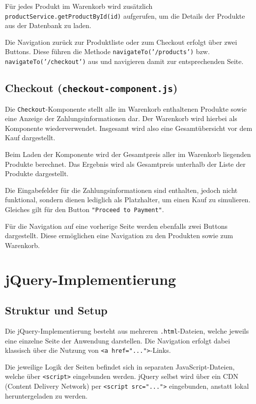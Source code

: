 \documentclass[oneside]{ausarbeitung}
\begin{document}
Für jedes Produkt im Warenkorb wird zusätzlich \texttt{productService.getProductById(id)} aufgerufen, um die Details der Produkte aus der Datenbank zu laden.

Die Navigation zurück zur Produktliste oder zum Checkout erfolgt über zwei Buttons. Diese führen die Methode \texttt{navigateTo('/products')} bzw. \texttt{navigateTo('/checkout')} aus und navigieren damit zur entsprechenden Seite.


\subsection{Checkout (\texttt{checkout-component.js})}

Die \texttt{Checkout}-Komponente stellt alle im Warenkorb enthaltenen Produkte sowie eine Anzeige der Zahlungsinformationen dar. Der Warenkorb wird hierbei als Komponente wiederverwendet. Insgesamt wird also eine Gesamtübersicht vor dem Kauf dargestellt.

Beim Laden der Komponente wird der Gesamtpreis aller im Warenkorb liegenden Produkte berechnet. Das Ergebnis wird als Gesamtpreis unterhalb der Liste der Produkte dargestellt. 

Die Eingabefelder für die Zahlungsinformationen sind enthalten, jedoch nicht funktional, sondern dienen lediglich als Platzhalter, um einen Kauf zu simulieren. Gleiches gilt für den Button \texttt{"Proceed to Payment"}.

Für die Navigation auf eine vorherige Seite werden ebenfalls zwei Buttons dargestellt. Diese ermöglichen eine Navigation zu den Produkten sowie zum Warenkorb.


\section{jQuery-Implementierung}

\subsection{Struktur und Setup}

Die jQuery-Implementierung besteht aus mehreren \texttt{.html}-Dateien, welche jeweils eine einzelne Seite der Anwendung darstellen. Die Navigation erfolgt dabei klassisch über die Nutzung von \texttt{<a href="...">}-Links.

Die jeweilige Logik der Seiten befindet sich in separaten JavaScript-Dateien, welche über \texttt{<script>} eingebunden werden. jQuery selbst wird über ein CDN (Content Delivery Network) per \texttt{<script src="...">} eingebunden, anstatt lokal heruntergeladen zu werden.
\end{document}
